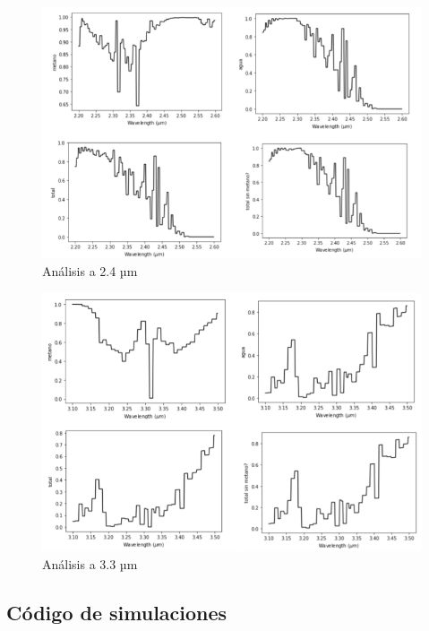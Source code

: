 \documentclass[11pt,titlepage]{article}
\begin{document}
\begin{figure}[htb!]
	\centering
	\includegraphics[width=15cm]{fig/analisis24.png}
	\caption{Análisis a 2.4 µm}
	\label{fig:analisis24}
\end{figure}
\begin{figure}[htb!]
	\centering
	\includegraphics[width=15cm]{fig/analisis33.png}
	\caption{Análisis a 3.3 µm}
	\label{fig:analisis33}
\end{figure}

\newpage
\subsection{Código de simulaciones}
\end{document}

